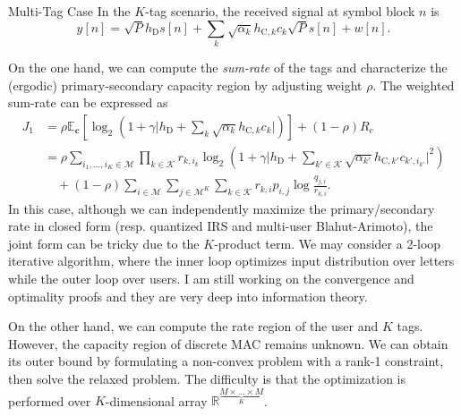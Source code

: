 \documentclass[journal]{IEEEtran}
\begin{document}
	\begin{section}{Multi-Tag Case}
		In the $K$-tag scenario, the received signal at symbol block $n$ is
		\begin{equation}
			y[n] = \sqrt{P} h_{\mathrm{D}} s[n] + \sum_k \sqrt{\alpha_k} h_{\mathrm{C},k} c_k \sqrt{P} s[n] + w[n].
		\end{equation}

		On the one hand, we can compute the \emph{sum-rate} of the tags and characterize the (ergodic) primary-secondary capacity region by adjusting weight $\rho$. The weighted sum-rate can be expressed as
		\begin{align}
			J_1
			& = \rho \mathbb{E}_{\boldsymbol{c}} \left[ \log_2 \left( 1 + \gamma \lvert h_{\mathrm{D}} + \sum_k \sqrt{\alpha_k} h_{\mathrm{C},k} c_k \rvert \right) \right] + (1 - \rho) R_c\\
			& = \rho \sum_{i_1,\dots,i_K \in \mathcal{M}} \prod_{k \in \mathcal{K}} r_{k,i_k} \log_2 \left( 1 + \gamma \lvert h_{\mathrm{D}} + \sum_{k' \in \mathcal{K}} \sqrt{\alpha_{k'}} h_{\mathrm{C},k'} c_{k',i_{k'}} \rvert^2 \right)\\
			& \quad + (1 - \rho) \sum_{i \in \mathcal{M}} \sum_{j \in \mathcal{M}^K} \sum_{k \in \mathcal{K}} r_{k,i} p_{i,j} \log \frac{q_{j,i}}{r_{k,i}}.
		\end{align}
		In this case, although we can independently maximize the primary/secondary rate in closed form (resp. quantized IRS and multi-user Blahut-Arimoto), the joint form can be tricky due to the $K$-product term. We may consider a 2-loop iterative algorithm, where the inner loop optimizes input distribution over letters while the outer loop over users. I am still working on the convergence and optimality proofs and they are very deep into information theory.

		On the other hand, we can compute the rate region of the user and $K$ tags. However, the capacity region of discrete MAC remains unknown. We can obtain its outer bound by formulating a non-convex problem with a rank-1 constraint, then solve the relaxed problem. The difficulty is that the optimization is performed over $K$-dimensional array $\mathbb{R}^{\underbrace{M \times \ldots \times M}_{K}}$.
	\end{section}
\end{document}
